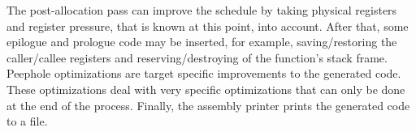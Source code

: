The post-allocation pass can improve the schedule by taking physical registers and register pressure, that is known at this point, into account. After that, some epilogue and prologue code may be inserted, for example, saving/restoring the caller/callee registers and reserving/destroying of the function's stack frame. Peephole optimizations are target specific improvements to the generated code. These optimizations deal with very specific optimizations that can only be done at the end of the process. Finally, the assembly printer prints the generated code to a file.









